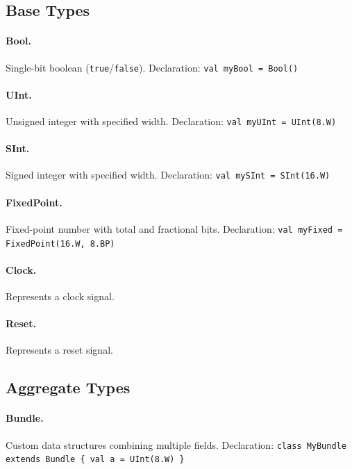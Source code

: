 \subsection{Base Types}
\paragraph{Bool.} Single-bit boolean (\texttt{true}/\texttt{false}). Declaration: \texttt{val myBool = Bool()}

\paragraph{UInt.} Unsigned integer with specified width. Declaration: \texttt{val myUInt = UInt(8.W)}

\paragraph{SInt.} Signed integer with specified width. Declaration: \texttt{val mySInt = SInt(16.W)}

\paragraph{FixedPoint.} Fixed-point number with total and fractional bits. Declaration: \texttt{val myFixed = FixedPoint(16.W, 8.BP)}

\paragraph{Clock.} Represents a clock signal.

\paragraph{Reset.} Represents a reset signal.

\subsection{Aggregate Types}
\paragraph{Bundle.} Custom data structures combining multiple fields. Declaration: \texttt{class MyBundle extends Bundle \{ val a = UInt(8.W) \}}

